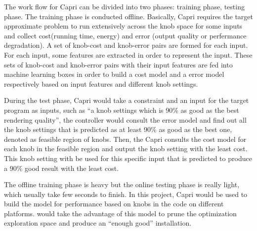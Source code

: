  The work flow for Capri can be divided into two phases: training
  phase, testing phase. The training phase is conducted
  offline. Basically, Capri requires the target approximate problem to run
  extensively across the knob space for some inputs and collect cost(running
  time, energy) and error (output quality or perfermance degradation). A set of
  knob-cost and knob-error pairs are formed for each input. For each input, some
  features are extracted in order to represent the input. These sets of
  knob-cost and knob-error pairs with their input features are fed into
  machine learning boxes in order to build a cost model and a error model
  respectively based on input features and different knob settings.

  During the test phase, Capri would take a
  constraint and an input for the target program as inputs, such as ``a knob
  settings which is 90\% as good as the best rendering quality'', the
  controller would consult the error model and find out
  all the knob settings that is predicted as at least 90\% as good as the best
  one, denoted as feasible region of knobs. Then, the Capri consults the
  cost model for each knob in the feasible region and output the knob setting
  with the least cost. This knob setting with be used for this specific input
  that is predicted to produce a 90\% good result with the least cost.

  The offline training phase is heavy but the online testing phase is really
  light, which usually take few seconds to finish. In this project, Capri would
  be used to build the model for \gem performance based on knobs in the code on
  different platforms. \atl would take the advantage of this model to prune
  the optimization exploration space and produce an ``enough good'' \gem
  installation.


